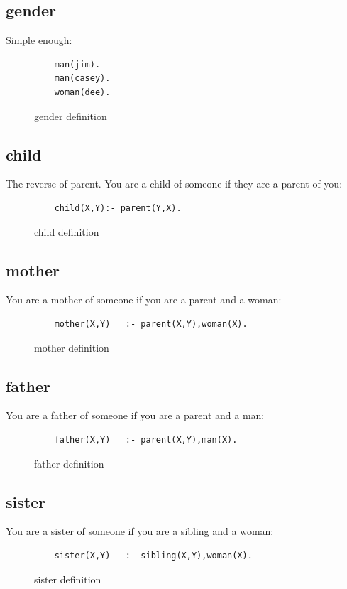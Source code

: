 \documentclass[12pt]{article}
\begin{document}
\pagebreak

\subsection{gender}
Simple enough:
\begin{figure}[!h]
 \begin{lstlisting}
	man(jim).
	man(casey).
	woman(dee).
 \end{lstlisting}
\caption{gender definition}
\label{spec}
\end{figure}


\subsection{child}
The reverse of parent. You are a child of someone if they are a parent of you:
\begin{figure}[!h]
 \begin{lstlisting}
	child(X,Y):- parent(Y,X).
 \end{lstlisting}
\caption{child definition}
\label{spec}
\end{figure}


\subsection{mother}
You are a mother of someone if you are a parent and a woman:
\begin{figure}[!h]
 \begin{lstlisting}
	mother(X,Y)   :- parent(X,Y),woman(X).
 \end{lstlisting}
\caption{mother definition}
\label{spec}
\end{figure}


\subsection{father}
You are a father of someone if you are a parent and a man:
\begin{figure}[!h]
 \begin{lstlisting}
	father(X,Y)   :- parent(X,Y),man(X).
 \end{lstlisting}
\caption{father definition}
\label{spec}
\end{figure}


\subsection{sister}
You are a sister of someone if you are a sibling and a woman:
\begin{figure}[!h]
 \begin{lstlisting}
	sister(X,Y)   :- sibling(X,Y),woman(X).
 \end{lstlisting}
\caption{sister definition}
\label{spec}
\end{figure}
\end{document}

